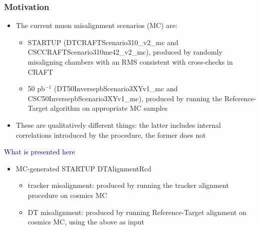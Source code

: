 \documentclass[compress]{beamer}
\begin{document}
\begin{frame}
\frametitle{Motivation}
\begin{itemize}
\item The current muon misalignment scenarios (MC) are:
\begin{itemize}
\item STARTUP {\scriptsize (DTCRAFTScenario310\_v2\_mc and CSCCRAFTScenario310me42\_v2\_mc)}, produced by randomly misaligning chambers with an RMS consistent with cross-checks in CRAFT
\item 50 pb$^{-1}$ {\scriptsize (DT50InversepbScenario3XYv1\_mc and CSC50InversepbScenario3XYv1\_mc)}, produced by running the Reference-Target algorithm on appropriate MC samples
\end{itemize}

\item These are qualitatively different things: the latter includes internal correlations introduced by the procedure, the former does not
\end{itemize}

\vspace{0.2 cm}
\hspace{-0.83 cm} \textcolor{darkblue}{\Large What is presented here}

\begin{itemize}
\item MC-generated STARTUP DTAlignmentRcd
\begin{itemize}
\item tracker misalignment: produced by running the tracker alignment procedure on cosmics MC
\item DT misalignment: produced by running Reference-Target alignment on cosmics MC, using the above as input
\end{itemize}

\end{itemize}
\end{frame}

\end{document}
